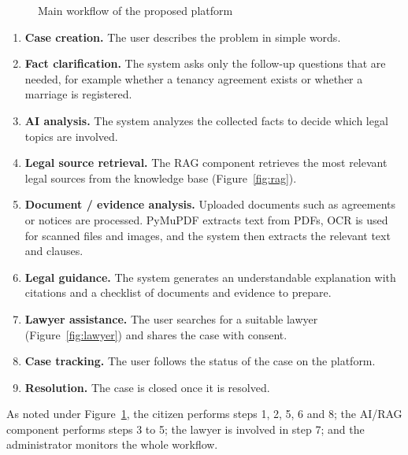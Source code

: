 \documentclass[12pt,a4paper]{report}
\begin{document}
\begin{figure}[H]
\centering
{}
\caption{Main workflow of the proposed platform}
\label{fig:workflow}
\end{figure}

\begin{enumerate}
  \item \textbf{Case creation.} The user describes the problem in simple words.
  \item \textbf{Fact clarification.} The system asks only the follow-up questions that are needed, for example whether a tenancy agreement exists or whether a marriage is registered.
  \item \textbf{AI analysis.} The system analyzes the collected facts to decide which legal topics are involved.
  \item \textbf{Legal source retrieval.} The RAG component retrieves the most relevant legal sources from the knowledge base (Figure~\ref{fig:rag}).
  \item \textbf{Document / evidence analysis.} Uploaded documents such as agreements or notices are processed. PyMuPDF extracts text from PDFs, OCR is used for scanned files and images, and the system then extracts the relevant text and clauses.
  \item \textbf{Legal guidance.} The system generates an understandable explanation with citations and a checklist of documents and evidence to prepare.
  \item \textbf{Lawyer assistance.} The user searches for a suitable lawyer (Figure~\ref{fig:lawyer}) and shares the case with consent.
  \item \textbf{Case tracking.} The user follows the status of the case on the platform.
  \item \textbf{Resolution.} The case is closed once it is resolved.
\end{enumerate}
As noted under Figure~\ref{fig:workflow}, the citizen performs steps 1, 2, 5, 6 and 8; the AI/RAG component performs steps 3 to 5; the lawyer is involved in step 7; and the administrator monitors the whole workflow.
\end{document}
